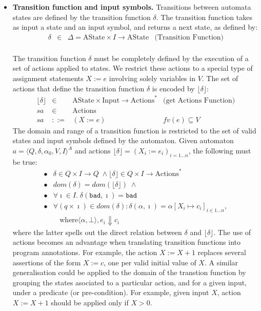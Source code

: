 \documentclass[10pt,notitlepage,twoside]{article}
\newcommand{\aut}{a}
\newcommand{\automata}[5]{\langle #1,#2,#3,#4,#5 \rangle^A}
\newcommand{\qu}{\alpha}
\newcommand{\theautomaton}{\automata{Q}{\delta}{\qu_0}{V}{I}}
\newcommand{\floor}[1]{\lfloor #1 \rfloor}
\newcommand{\evale}[2]{#1 \Downarrow #2}
\newcommand{\state}[1]{\langle #1 \rangle}
\begin{document}
\begin{itemize}
\item \textbf{Transition function and input symbols.} Transitions between automata states are defined by the transition function $\delta$. The transition function takes as input a state and an input symbol, and returns a next state, as defined by:
\begin{displaymath}
\begin{array}{rcll}
\delta & \in & \Delta = \textrm{AState} \times I \rightarrow \textrm{AState} & \mbox{(Transition Function)} \\
\end{array}
\end{displaymath}

The transition function $\delta$ must be completely  defined by the execution of a set of actions applied to states. We restrict these actions to a special type of assignment statements $X := e$ involving solely variables in  $V$. 
The set of actions that define the transition function $\delta$ is encoded by $\floor{\delta}$:
\begin{displaymath}
\begin{array}{rcll}
\floor{\delta} & \in & \textrm{AState} \times \textrm{Input} \rightarrow \textrm{Actions}^* & \mbox{(get Actions Function)} \\
sa  & \in &  \textrm{Actions} \\
sa & ::= & (X := e) & fv(e) \subseteq V
\end{array}
\end{displaymath}
The domain and range of a transition function is restricted to the set of valid states and input symbols defined by the automaton. 
Given automaton $\aut = \theautomaton$ and  actions $\floor{\delta} = (X_i := e_i)_{i=1\ldots n}$, the following must be true:
\begin{displaymath}
\begin{array}{ll}
\bullet & \delta \in Q \times I \rightarrow Q \;\wedge \floor{\delta} \in Q \times I \rightarrow \textrm{Actions}^*  \\
\bullet & dom(\delta) = dom(\floor{\delta}) \;\wedge \\
\bullet & \forall \imath \in I.\; \delta(\texttt{bad},\imath) = \texttt{bad}\\
\bullet & \forall (q \times \imath) \in dom(\delta): 
        \delta(\qu,\imath) = \qu[X_i \mapsto c_i]_{i \in 1\ldots n},\\
& \;\;\mbox{ where} \evale{\state{\qu,\bot},e_i}{c_i}
\end{array}
\end{displaymath}
where the latter spells out the direct relation between $\delta$ and $\floor{\delta}$. 
The use of actions becomes an advantage when translating transition functions  into program annotations. For example, the action $X := X + 1$ replaces several assertions of the form $X := c$, one per valid initial value of $X$. 
A similar generalisation could be applied to the domain of the transtion function by grouping the states asociated to a particular action, and for a given input, under a predicate (or pre-condition). For example, given input $X$, action $X := X + 1$ should be applied only if $X > 0$.


\end{itemize}
\end{document}
